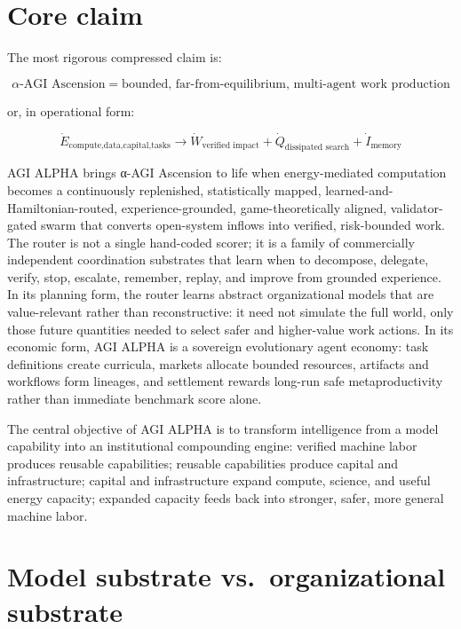 \documentclass[11pt]{article}
\begin{document}
\section{Core claim}\label{core-claim}

The most rigorous compressed claim is:

\[
\boxed{
\alpha\text{-AGI Ascension}
=
\text{bounded, far-from-equilibrium, multi-agent work production}
}
\]

or, in operational form:

\[
\boxed{
\dot{E}_{\text{compute,data,capital,tasks}}
\rightarrow
\dot{W}_{\text{verified impact}}
+
\dot{Q}_{\text{dissipated search}}
+
\dot{I}_{\text{memory}}
}
\]

AGI ALPHA brings α-AGI Ascension to life when energy-mediated computation becomes a continuously replenished, statistically mapped, learned-and-Hamiltonian-routed, experience-grounded, game-theoretically aligned, validator-gated swarm that converts open-system inflows into verified, risk-bounded work. The router is not a single hand-coded scorer; it is a family of commercially independent coordination substrates that learn when to decompose, delegate, verify, stop, escalate, remember, replay, and improve from grounded experience. In its planning form, the router learns abstract organizational models that are value-relevant rather than reconstructive: it need not simulate the full world, only those future quantities needed to select safer and higher-value work actions. In its economic form, AGI ALPHA is a sovereign evolutionary agent economy: task definitions create curricula, markets allocate bounded resources, artifacts and workflows form lineages, and settlement rewards long-run safe metaproductivity rather than immediate benchmark score alone.

The central objective of AGI ALPHA is to transform intelligence from a model capability into an institutional compounding engine: verified machine labor produces reusable capabilities; reusable capabilities produce capital and infrastructure; capital and infrastructure expand compute, science, and useful energy capacity; expanded capacity feeds back into stronger, safer, more general machine labor.

\section{Model substrate vs.~organizational substrate}\label{model-substrate-vs.-organizational-substrate}
\end{document}
